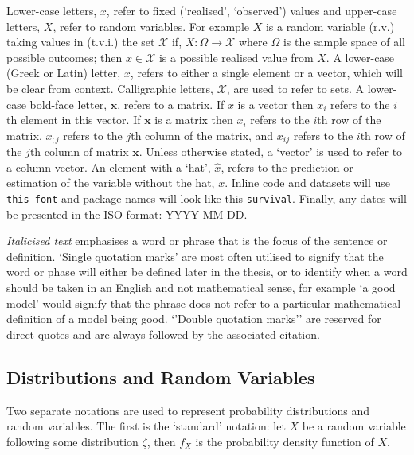 \documentclass[
  letterpaper,
]{scrbook}
\theoremstyle{plain}
\theoremstyle{definition}
\theoremstyle{remark}
\begin{document}
Lower-case letters, \(x\), refer to fixed (`realised', `observed')
values and upper-case letters, \(X\), refer to random variables. For
example \(X\) is a random variable (r.v.) taking values in (t.v.i.) the
set \(\mathcal{X}\) if, \(X: \Omega \rightarrow \mathcal{X}\) where
\(\Omega\) is the sample space of all possible outcomes; then
\(x \in \mathcal{X}\) is a possible realised value from \(X\). A
lower-case (Greek or Latin) letter, \(x\), refers to either a single
element or a vector, which will be clear from context. Calligraphic
letters, \(\mathcal{X}\), are used to refer to sets. A lower-case
bold-face letter, \(\mathbf{x}\), refers to a matrix. If \(x\) is a
vector then \(x_i\) refers to the \(i\)th element in this vector. If
\(\mathbf{x}\) is a matrix then \(x_i\) refers to the \(i\)th row of the
matrix, \(x_{;j}\) refers to the \(j\)th column of the matrix, and
\(x_{ij}\) refers to the \(i\)th row of the \(j\)th column of matrix
\(\mathbf{x}\). Unless otherwise stated, a `vector' is used to refer to
a column vector. An element with a `hat', \(\hat{x}\), refers to the
prediction or estimation of the variable without the hat, \(x\). Inline
code and datasets will use \texttt{this\ font} and package names will
look like this
\href{https://cran.r-project.org/package=survival}{\texttt{survival}}.
Finally, any dates will be presented in the ISO format: YYYY-MM-DD.

\emph{Italicised text} emphasises a word or phrase that is the focus of
the sentence or definition. `Single quotation marks' are most often
utilised to signify that the word or phase will either be defined later
in the thesis, or to identify when a word should be taken in an English
and not mathematical sense, for example `a good model' would signify
that the phrase does not refer to a particular mathematical definition
of a model being good. `'Double quotation marks'' are reserved for
direct quotes and are always followed by the associated citation.

\hypertarget{distributions-and-random-variables}{%
\subsection*{Distributions and Random
Variables}\label{distributions-and-random-variables}}

Two separate notations are used to represent probability distributions
and random variables. The first is the `standard' notation: let \(X\) be
a random variable following some distribution \(\zeta\), then \(f_X\) is
the probability density function of \(X\).
\end{document}
